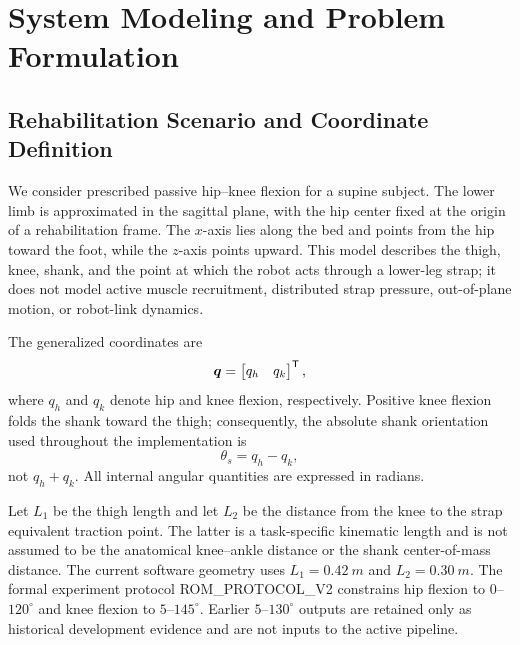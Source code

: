 \section{System Modeling and Problem Formulation}
\label{sec:modeling}

\subsection{Rehabilitation Scenario and Coordinate Definition}
\label{subsec:scenario}

We consider prescribed passive hip--knee flexion for a supine subject.  The
lower limb is approximated in the sagittal plane, with the hip center fixed at
the origin of a rehabilitation frame.  The $x$-axis lies along the bed and
points from the hip toward the foot, while the $z$-axis points upward.  This
model describes the thigh, knee, shank, and the point at which the robot acts
through a lower-leg strap; it does not model active muscle recruitment,
distributed strap pressure, out-of-plane motion, or robot-link dynamics.

The generalized coordinates are
\begin{equation}
    \bm{q}=\begin{bmatrix}q_h & q_k\end{bmatrix}^{\mathsf T},
    \label{eq:generalized_coordinates}
\end{equation}
where $q_h$ and $q_k$ denote hip and knee flexion, respectively.  Positive knee
flexion folds the shank toward the thigh; consequently, the absolute shank
orientation used throughout the implementation is
\begin{equation}
    \theta_s=q_h-q_k,
    \label{eq:shank_angle}
\end{equation}
not $q_h+q_k$.  All internal angular quantities are expressed in radians.

Let $L_1$ be the thigh length and let $L_2$ be the distance from the knee to the
strap equivalent traction point.  The latter is a task-specific kinematic
length and is not assumed to be the anatomical knee--ankle distance or the
shank center-of-mass distance.  The current software geometry uses
$L_1=\SI{0.42}{m}$ and $L_2=\SI{0.30}{m}$.  The formal experiment protocol
ROM\_PROTOCOL\_V2 constrains hip flexion to $0$--$120^{\circ}$ and knee flexion
to $5$--$145^{\circ}$.  Earlier $5$--$130^{\circ}$ outputs are retained only as
historical development evidence and are not inputs to the active pipeline.

